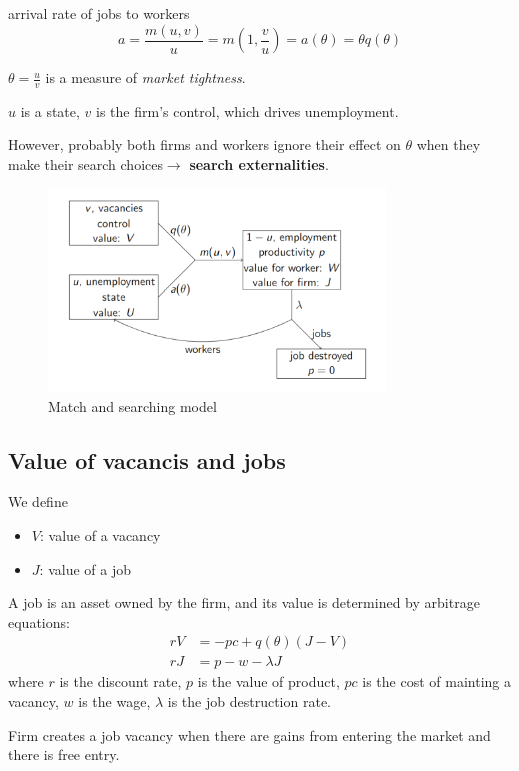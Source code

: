 arrival rate of jobs to workers
\[a = \frac{m(u, v)}{u} = m\left(1, \frac{v}{u}\right) = a(\theta) = \theta q(\theta)\]

$\theta =\frac{u}{v}$ is a measure of \textit{market tightness}.

$u$ is a state, $v$ is the firm's control, which drives unemployment.

However, probably both firms and workers ignore their effect
on $\theta$ when they make their search choices$ \rightarrow$ \textbf{search externalities}.

\begin{figure}[!htbp]
    \centering
    \includegraphics[width=0.8\textwidth]{figures/matchsearching.png}
    \caption{Match and searching model}
\end{figure}

\subsection{Value of vacancis and jobs}
We define
\begin{itemize}
    \item $V$: value of a vacancy
    \item $J$: value of a job
\end{itemize}

A job is an asset owned by the firm, and its value is determined by arbitrage equations:
\begin{align*}
    rV &= -pc + q(\theta)(J-V) \\
    rJ &= p - w - \lambda J
\end{align*}
where $r$ is the discount rate, $p$ is the value of product, 
$pc$ is the cost of mainting a vacancy, $w$ is the wage, 
$\lambda$ is the job destruction rate.

Firm creates a job vacancy when there are gains from entering the
market and there is free entry.

